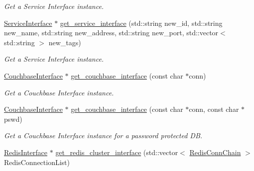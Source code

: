 \begin{DoxyCompactItemize}
\begin{DoxyCompactList}\small\item\em Get a Service Interface instance. \end{DoxyCompactList}\item 
\hypertarget{classServiceComponentFactory_a3461ba8dac008cf74b117b626a1851b2}{\hyperlink{classServiceInterface}{Service\-Interface} $\ast$ \hyperlink{classServiceComponentFactory_a3461ba8dac008cf74b117b626a1851b2}{get\-\_\-service\-\_\-interface} (std\-::string new\-\_\-id, std\-::string new\-\_\-name, std\-::string new\-\_\-address, std\-::string new\-\_\-port, std\-::vector$<$ std\-::string $>$ new\-\_\-tags)}\label{classServiceComponentFactory_a3461ba8dac008cf74b117b626a1851b2}

\begin{DoxyCompactList}\small\item\em Get a Service Interface instance. \end{DoxyCompactList}\item 
\hypertarget{classServiceComponentFactory_ab0054b867f4ceb06217a035a8909ca65}{\hyperlink{classCouchbaseInterface}{Couchbase\-Interface} $\ast$ \hyperlink{classServiceComponentFactory_ab0054b867f4ceb06217a035a8909ca65}{get\-\_\-couchbase\-\_\-interface} (const char $\ast$conn)}\label{classServiceComponentFactory_ab0054b867f4ceb06217a035a8909ca65}

\begin{DoxyCompactList}\small\item\em Get a Couchbase Interface instance. \end{DoxyCompactList}\item 
\hypertarget{classServiceComponentFactory_ae0c38d94599bcf148704d3436a529d13}{\hyperlink{classCouchbaseInterface}{Couchbase\-Interface} $\ast$ \hyperlink{classServiceComponentFactory_ae0c38d94599bcf148704d3436a529d13}{get\-\_\-couchbase\-\_\-interface} (const char $\ast$conn, const char $\ast$pswd)}\label{classServiceComponentFactory_ae0c38d94599bcf148704d3436a529d13}

\begin{DoxyCompactList}\small\item\em Get a Couchbase Interface instance for a password protected D\-B. \end{DoxyCompactList}\item 
\hypertarget{classServiceComponentFactory_a960660c5cb312c1cdb6b20bd87c2e2d5}{\hyperlink{classRedisInterface}{Redis\-Interface} $\ast$ \hyperlink{classServiceComponentFactory_a960660c5cb312c1cdb6b20bd87c2e2d5}{get\-\_\-redis\-\_\-cluster\-\_\-interface} (std\-::vector$<$ \hyperlink{structRedisConnChain}{Redis\-Conn\-Chain} $>$ Redis\-Connection\-List)}\label{classServiceComponentFactory_a960660c5cb312c1cdb6b20bd87c2e2d5}


\end{DoxyCompactItemize}

